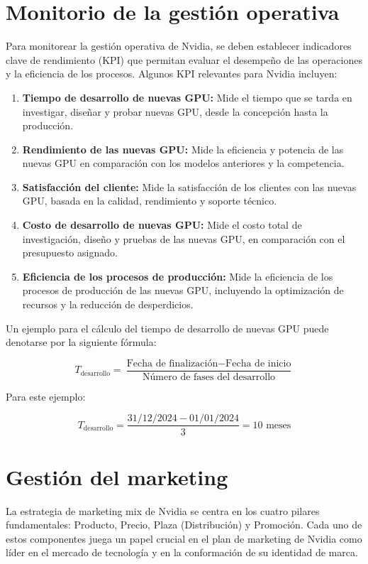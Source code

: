 \documentclass{article}
\begin{document}
\section{Monitorio de la gestión operativa}
\vspace{-0.5cm}
Para monitorear la gestión operativa de Nvidia, se deben establecer indicadores clave de rendimiento (KPI) que permitan evaluar el desempeño de las operaciones y la eficiencia de los procesos. Algunos KPI relevantes para Nvidia incluyen:
\vspace{-0.5cm}
\begin{enumerate}
  \item \textbf{Tiempo de desarrollo de nuevas GPU:} Mide el tiempo que se tarda en investigar, diseñar y probar nuevas GPU, desde la concepción hasta la producción.
  \item \textbf{Rendimiento de las nuevas GPU:} Mide la eficiencia y potencia de las nuevas GPU en comparación con los modelos anteriores y la competencia.
  \item \textbf{Satisfacción del cliente:} Mide la satisfacción de los clientes con las nuevas GPU, basada en la calidad, rendimiento y soporte técnico.
  \item \textbf{Costo de desarrollo de nuevas GPU:} Mide el costo total de investigación, diseño y pruebas de las nuevas GPU, en comparación con el presupuesto asignado.
  \item \textbf{Eficiencia de los procesos de producción:} Mide la eficiencia de los procesos de producción de las nuevas GPU, incluyendo la optimización de recursos y la reducción de desperdicios.
\end{enumerate}

Un ejemplo para el cálculo del tiempo de desarrollo de nuevas GPU puede denotarse por la siguiente fórmula:

\[
T_{\text{desarrollo}} = \frac{\text{Fecha de finalización} - \text{Fecha de inicio}}{\text{Número de fases del desarrollo}}
\]

Para este ejemplo:

\[
T_{\text{desarrollo}} = \frac{31/12/2024 - 01/01/2024}{3} = 10 \text{ meses}
\]



\section{Gestión del marketing}

La estrategia de marketing mix de Nvidia se centra en los cuatro pilares fundamentales: Producto, Precio, Plaza (Distribución) y Promoción. Cada uno de estos componentes juega un papel crucial en el plan de marketing de Nvidia como líder en el mercado de tecnología y en la conformación de su identidad de marca. 
\end{document}

